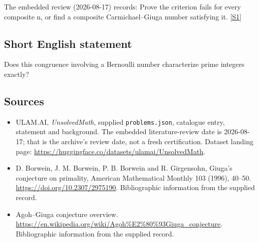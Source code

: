 \documentclass[11pt,a4paper]{article}
\newcommand{\sref}[2]{\hyperlink{source:#1:#2}{[S#2]}}
\begin{document}
The embedded review (2026-08-17) records: Prove the criterion fails for every composite n, or find a composite Carmichael--Giuga number satisfying it. \sref{statement}{1}

\subsection{Short English statement}

Does this congruence involving a Bernoulli number characterize prime integers exactly?

\subsection{Sources}

{\small

\begin{itemize}

\item[\hypertarget{source:statement:1}{S1}] ULAM.AI, \emph{UnsolvedMath}, supplied \texttt{problems.json}, catalogue entry, statement and background. The embedded literature-review date is 2026-08-17; that is the archive’s review date, not a fresh certification. Dataset landing page: \url{https://huggingface.co/datasets/ulamai/UnsolvedMath}.

\item[\hypertarget{source:statement:2}{S2}] D. Borwein, J. M. Borwein, P. B. Borwein and R. Girgensohn, Giuga's conjecture on primality, American Mathematical Monthly 103 (1996), 40--50. \url{https://doi.org/10.2307/2975190}. Bibliographic information from the supplied record.

\item[\hypertarget{source:statement:3}{S3}] Agoh--Giuga conjecture overview. \url{https://en.wikipedia.org/wiki/Agoh%E2%80%93Giuga_conjecture}. Bibliographic information from the supplied record.

\end{itemize}

}

\label{end:statement}
\end{document}

